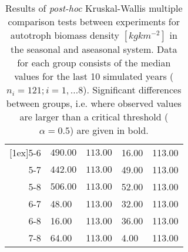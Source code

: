 \begin{table}[ht]
\begin{tabularx}{\textwidth}{rXXXX}
   [1ex]5-6 & \(\mathbf{490.00}\) & \(\mathbf{113.00}\) & 16.00 & 113.00 \\ 
  5-7 & \(\mathbf{442.00}\) & \(\mathbf{113.00}\) & 49.00 & 113.00 \\ 
  5-8 & \(\mathbf{506.00}\) & \(\mathbf{113.00}\) & 52.00 & 113.00 \\ 
   [1ex]6-7 & 48.00 & 113.00 & 32.00 & 113.00 \\ 
  6-8 & 16.00 & 113.00 & 36.00 & 113.00 \\ 
   [1ex]7-8 & 64.00 & 113.00 & 4.00 & 113.00 \\ 
   \bottomrule
\end{tabularx}
\caption[Kruskal-Wallis multiple comparison of autotroph biomass density.]{Results of \textit{post-hoc} Kruskal-Wallis multiple comparison
                tests between experiments for autotroph biomass density $[kgkm^{-2}]$ in the seasonal and aseasonal system. 
                  Data for each group consists of the median values for the last 10 simulated years ($n_{i} = 121; i = 1,\ldots8$). 
                  Significant differences between groups, i.e. where observed 
                values are larger than a critical threshold ($\alpha = 0.5$) are given in bold.} 
\label{chap:res:dyn}
\end{table}
